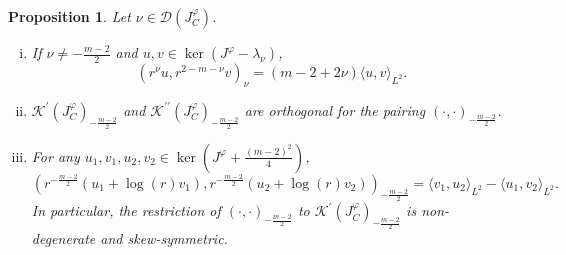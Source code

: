 \documentclass{article}
\numberwithin{equation}{section}        %
\theoremstyle{bfnote}
\newtheorem{prop}[thm]{Proposition}         %
\theoremstyle{definition}
\theoremstyle{bfremark}
\begin{document}
\begin{prop}        \label{prop: Polyhomoegenous pairing}
    Let $\nu \in \mathcal{D}(J^\varphi_C)$.
    \begin{enumerate}[(i)]
        \item If $\nu \neq -\tfrac{m-2}{2}$ and $u, v \in \ker(J^\varphi-\lambda_\nu)$, 
        \begin{equation*}
            (r^\nu u, r^{2-m-\nu} v )_\nu = (m-2 + 2\nu) \langle u, v \rangle_{L^2} .
        \end{equation*}

        \item $\mathcal{K}^\prime(J^\varphi_C)_{-\tfrac{m-2}{2}}$ and $\mathcal{K}^{\prime\prime}(J^\varphi_C)_{-\tfrac{m-2}{2}}$ are orthogonal for the pairing $(\cdot,\cdot)_{-\tfrac{m-2}{2}}$.
        
        \item For any $u_1,v_1,u_2,v_2 \in \ker(J^\varphi+\tfrac{(m-2)^2}{4})$,
        \begin{equation*}
            (r^{-\tfrac{m-2}{2}}(u_1 + \log(r) v_1), r^{-\tfrac{m-2}{2}}(u_2+\log(r)v_2) )_{-\tfrac{m-2}{2}} = \langle v_1, u_2 \rangle_{L^2} - \langle u_1, v_2 \rangle_{L^2} .
        \end{equation*}
        In particular, the restriction of $(\cdot,\cdot)_{-\tfrac{m-2}{2}}$ to $\mathcal{K}^\prime(J^\varphi_C)_{-\tfrac{m-2}{2}}$ is non-degenerate and skew-symmetric.
    \end{enumerate}
\end{prop}
\end{document}
